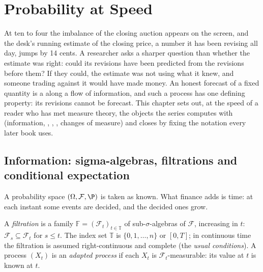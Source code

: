 \chapter{Probability at Speed}\label{ch:qm:probability-at-speed}

At ten to four the imbalance of the closing auction appears on the screen, and the desk's
running estimate of the closing price, a number it has been revising all day, jumps by 14
cents. A researcher asks a sharper question than whether the estimate was right: could its
revisions have been predicted from the revisions before them? If they could, the estimate was
not using what it knew, and someone trading against it would have made money. An honest
forecast of a fixed quantity is a  along a flow of information, and
such a process has one defining property: its revisions cannot be forecast. This chapter sets
out, at the speed of a reader who has met measure theory, the objects the series computes
with (information, , , , changes of measure)
and closes by fixing the notation every later book uses.

\section{Information: sigma-algebras, filtrations and conditional expectation}

A probability space $(\Omega, \mathcal F, \P)$ is taken as known. What finance adds is
time: at each instant some events are decided, and the decided ones grow.

\begin{definition}\label{def:qm:probability-at-speed:filtration}
A \emph{filtration} is a family $\mathbb F = (\mathcal F_t)_{t \in
\mathbb T}$ of sub-$\sigma$-algebras of $\mathcal F$, increasing in $t$: $\mathcal F_s
\subseteq \mathcal F_t$ for $s \le t$. The index set $\mathbb T$ is $\{0, 1, \dots, n\}$ or
$[0, T]$; in continuous time the filtration is assumed right-continuous and complete (the
\emph{usual conditions}). A process $(X_t)$ is an \emph{adapted process} if each $X_t$ is $\mathcal F_t$-measurable: its value at $t$ is known at $t$.
\end{definition}

